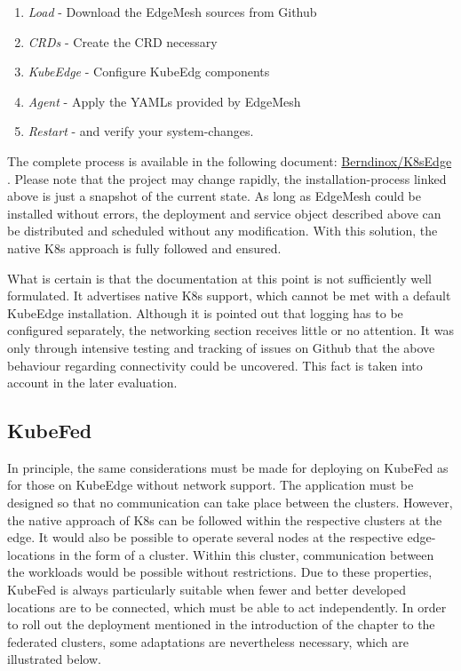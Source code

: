 \documentclass[MIC,Master,english]{twbook}%
\begin{document}
\begin{enumerate}
    \item \textit{Load} - Download the EdgeMesh sources from Github
    \item \textit{CRDs} - Create the \ac{CRD} necessary
    \item \textit{KubeEdge} - Configure KubeEdg components
    \item \textit{Agent} - Apply the YAMLs provided by EdgeMesh
    \item \textit{Restart} - and verify your system-changes.
\end{enumerate}

The complete process is available in the following document: \hyperref{https://github.com/Berndinox/K8sEdge/blob/main/DOCs/kubeedge-edgemesh.md}{}{}{Berndinox/K8sEdge} \cite{bk-gh-edgemesh}. Please note that the project may change rapidly, the installation-process linked above is just a snapshot of the current state. As long as EdgeMesh could be installed without errors, the deployment and service object described above can be distributed and scheduled without any modification. With this solution, the native \ac{K8s} approach is fully followed and ensured.\medbreak

What is certain is that the documentation at this point is not sufficiently well formulated. It advertises native \ac{K8s} support, which cannot be met with a default KubeEdge installation. Although it is pointed out that logging has to be configured separately, the networking section receives little or no attention. It was only through intensive testing and tracking of issues on Github that the above behaviour regarding connectivity could be uncovered. This fact is taken into account in the later evaluation.

\subsection{KubeFed} In principle, the same considerations must be made for deploying on KubeFed as for those on KubeEdge without network support. The application must be designed so that no communication can take place between the clusters. However, the native approach of \ac{K8s} can be followed within the respective clusters at the edge. It would also be possible to operate several nodes at the respective edge-locations in the form of a cluster. Within this cluster, communication between the workloads would be possible without restrictions. Due to these properties, KubeFed is always particularly suitable when fewer and better developed locations are to be connected, which must be able to act independently. In order to roll out the deployment mentioned in the introduction of the chapter to the federated clusters, some adaptations are nevertheless necessary, which are illustrated below.
\end{document}
